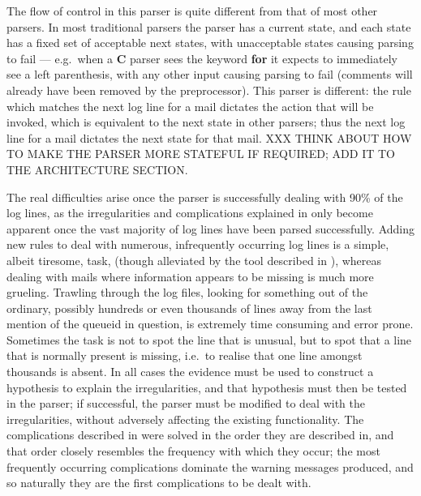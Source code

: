 
The flow of control in this parser is quite different from that of most
other parsers.  In most traditional parsers the parser has a current state,
and each state has a fixed set of acceptable next states, with unacceptable
states causing parsing to fail --- e.g.\ when a \textbf{C} parser sees the
keyword \textbf{for} it expects to immediately see a left parenthesis, with
any other input causing parsing to fail (comments will already have been
removed by the preprocessor).  This parser is different: the rule which
matches the next log line for a mail dictates the action that will be
invoked, which is equivalent to the next state in other parsers; thus the
next log line for a mail dictates the next state for that mail.  XXX THINK
ABOUT HOW TO MAKE THE PARSER MORE STATEFUL IF REQUIRED\@; ADD IT TO THE
ARCHITECTURE SECTION\@.

The real difficulties arise once the parser is successfully dealing with
90\% of the log lines, as the irregularities and complications explained in
 only become apparent once the vast majority of
log lines have been parsed successfully.  Adding new rules to deal with
numerous, infrequently occurring log lines is a simple, albeit tiresome,
task, (though alleviated by the tool described in ), whereas dealing with mails where information appears to be
missing is much more grueling.  Trawling through the log files, looking for
something out of the ordinary, possibly hundreds or even thousands of lines
away from the last mention of the queueid in question, is extremely time
consuming and error prone.  Sometimes the task is not to spot the line that
is unusual, but to spot that a line that is normally present is missing,
i.e.\ to realise that one line amongst thousands is absent.  In all cases
the evidence must be used to construct a hypothesis to explain the
irregularities, and that hypothesis must then be tested in the parser; if
successful, the parser must be modified to deal with the irregularities,
without adversely affecting the existing functionality.  The complications
described in  were solved in the order they are
described in, and that order closely resembles the frequency with which
they occur; the most frequently occurring complications dominate the
warning messages produced, and so naturally they are the first
complications to be dealt with.

